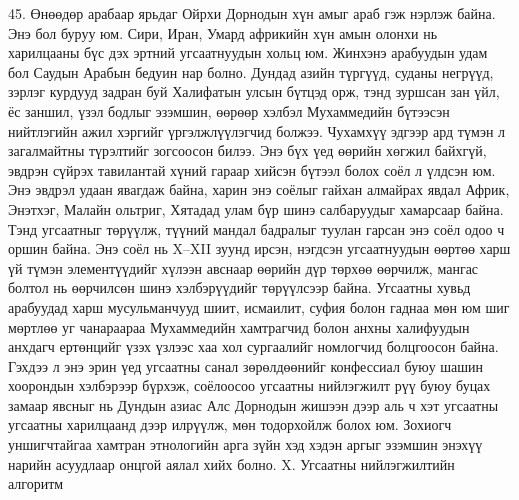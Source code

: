 45. Өнөөдөр арабаар ярьдаг Ойрхи Дорнодын хүн амыг араб гэж нэрлэж байна. Энэ бол буруу юм. Сири, Иран, Умард африкийн хүн амын олонхи нь харилцааны бүс дэх эртний угсаатнуудын хольц юм. Жинхэнэ арабуудын удам бол Саудын Арабын бедуин нар болно.
Дундад азийн түргүүд, суданы негрүүд, зэрлэг курдууд задран буй Халифатын улсын бүтцэд орж, тэнд зуршсан зан үйл, ёс заншил, үзэл бодлыг эзэмшин, өөрөөр хэлбэл Мухаммедийн бүтээсэн нийтлэгийн ажил хэргийг үргэлжлүүлэгчид болжээ. Чухамхүү эдгээр ард түмэн л загалмайтны түрэлтийг зогсоосон билээ. Энэ бүх үед өөрийн хөгжил байхгүй, эвдрэн сүйрэх тавилантай хүний гараар хийсэн бүтээл болох соёл л үлдсэн юм. Энэ эвдрэл удаан явагдаж байна, харин энэ соёлыг гайхан алмайрах явдал Африк, Энэтхэг, Малайн ольтриг, Хятадад улам бүр шинэ салбаруудыг хамарсаар байна. Тэнд угсаатныг төрүүлж, түүний мандал бадралыг туулан гарсан энэ соёл одоо ч оршин байна.
Энэ соёл нь X–XII зуунд ирсэн, нэгдсэн угсаатнуудын өөртөө харш үй түмэн элементүүдийг хүлээн авснаар өөрийн дүр төрхөө өөрчилж, мангас болтол нь өөрчилсөн шинэ хэлбэрүүдийг төрүүлсээр байна. Угсаатны хувьд арабуудад харш мусульманчууд шиит, исмаилит, суфия болон гаднаа мөн юм шиг мөртлөө уг чанараараа Мухаммедийн хамтрагчид болон анхны халифуудын анхдагч ертөнцийг үзэх үзлээс хаа хол сургаалийг номлогчид болцгоосон байна. Гэхдээ л энэ эрин үед угсаатны санал зөрөлдөөнийг конфессиал буюу шашин хоорондын хэлбэрээр бүрхэж, соёлоосоо угсаатны нийлэгжилт рүү буюу буцах замаар явсныг нь Дундын азиас Алс Дорнодын жишээн дээр аль ч хэт угсаатны угсаатны харилцаанд дээр илрүүлж, мөн тодорхойлж болох юм. Зохиогч уншигчтайгаа хамтран этнологийн арга зүйн хэд хэдэн аргыг эзэмшин энэхүү нарийн асуудлаар онцгой аялал хийх болно.
X. Угсаатны нийлэгжилтийн алгоритм
